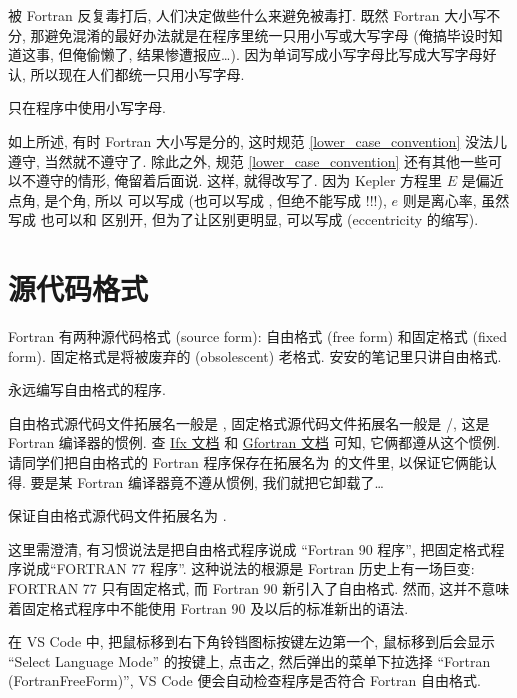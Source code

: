被 Fortran 反复毒打后, 人们决定做些什么来避免被毒打. 既然 Fortran 大小写不分, 那避免混淆的最好办法就是在程序里统一只用小写或大写字母 (俺搞毕设时知道这事, 但俺偷懒了, 结果惨遭报应\dots{}). 因为单词写成小写字母比写成大写字母好认, 所以现在人们都统一只用小写字母.
\begin{convention}
    只在程序中使用小写字母.\label{lower_case_convention}
\end{convention}
如上所述, 有时 Fortran 大小写是分的, 这时规范 \ref{lower_case_convention} 没法儿遵守, 当然就不遵守了. 除此之外, 规范 \ref{lower_case_convention} 还有其他一些可以不遵守的情形, 俺留着后面说. 这样,  就得改写了. 因为 Kepler 方程里 $E$ 是偏近点角, 是个角, 所以  可以写成  (也可以写成 , 但绝不能写成 !!!), $e$ 则是离心率, 虽然写成  也可以和  区别开, 但为了让区别更明显, 可以写成  (eccentricity 的缩写).

\section{源代码格式}

Fortran 有两种源代码格式 (source form): 自由格式 (free form) 和固定格式 (fixed form). 固定格式是将被废弃的 (obsolescent) 老格式. 安安的笔记里只讲自由格式.
\begin{convention}
    永远编写自由格式的程序.
\end{convention}

自由格式源代码文件拓展名一般是 , 固定格式源代码文件拓展名一般是 /, 这是 Fortran 编译器的惯例. 查 \href{https://cdrdv2.intel.com/v1/dl/getContent/824360?fileName=fortran-compiler_developer-guide-reference_2024.2-767251-824360.pdf}{Ifx 文档} 和 \href{https://gcc.gnu.org/onlinedocs/gcc-13.2.0/gfortran.pdf}{Gfortran 文档} 可知, 它俩都遵从这个惯例. 请同学们把自由格式的 Fortran 程序保存在拓展名为  的文件里, 以保证它俩能认得. 要是某 Fortran 编译器竟不遵从惯例, 我们就把它卸载了\dots{}
\begin{convention}
    保证自由格式源代码文件拓展名为 .
\end{convention}

这里需澄清, 有习惯说法是把自由格式程序说成 ``Fortran 90 程序'', 把固定格式程序说成``FORTRAN 77 程序''. 这种说法的根源是 Fortran 历史上有一场巨变: FORTRAN 77 只有固定格式, 而 Fortran 90 新引入了自由格式. 然而, 这并不意味着固定格式程序中不能使用 Fortran 90 及以后的标准新出的语法.

在 VS Code 中, 把鼠标移到右下角铃铛图标按键左边第一个, 鼠标移到后会显示 ``Select Language Mode'' 的按键上, 点击之, 然后弹出的菜单下拉选择 ``Fortran (FortranFreeForm)'', VS Code 便会自动检查程序是否符合 Fortran 自由格式.

